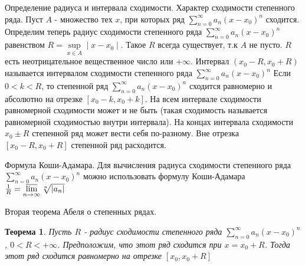 \documentclass[12pt, a4paper]{article}
\newtheorem{thm}{Теорема}
\newenvironment{field}{}{\newpage}
\newif\ifnote
\newenvironment{note}{\notetrue}{\notefalse}
\begin{document}
\begin{note}
\begin{field}
Определение радиуса и интервала сходимости. Характер сходимости степенного ряда.
\end{field}
\begin{field}
Пуст $A$ - множество тех $x$, при которых ряд $\sum\limits_{n=0}^{\infty}a_n(x-x_0)^n$ сходится.
\newline
Определим теперь радиус сходимости степенного ряда $\sum\limits_{n=0}^{\infty}a_n(x-x_0)^n$ равенством $R = \sup\limits_{x \in A}\mid x - x_0 \mid$. Такое $R$ всегда существует, т.к $A$ не пусто. $R$ есть неотрицательное вещественное число или $+\infty$.
\newline
Интервал $(x_0 - R, x_0 + R)$ называется интервалом сходимости степенного ряда $\sum\limits_{n=0}^{\infty}a_n(x-x_0)^n$
\newline
Если $0 < k < R$, то степенной ряд $\sum\limits_{n=0}^{\infty}a_n(x-x_0)^n$ сходится равномерно и абсолютно на отрезке $[x_0 - k, x_0 + k]$. На всем интервале сходимости равномерной сходимости может и не быть (такая сходимость называется равномерной сходимостью внутри интервала). На концах интервала сходимости $x_0 \pm R$ степенной ряд может вести себя по-разному. Вне отрезка $[x_0 - R, x_0 + R]$ степенной ряд расходится.

\end{field}
\end{note}

\begin{note}
\begin{field}
Формула Коши-Адамара.
\end{field}
\begin{field}
Для вычисления радиуса сходимости степенного ряда $\sum\limits_{n=0}^{\infty}a_n(x-x_0)^n$ можно использовать формулу Коши-Адамара $\frac{1}{R} = \varlimsup\limits_{n \to \infty}\sqrt[n]{|a_n|}$


\end{field}
\end{note}

\begin{note}
\begin{field}
Вторая теорема Абеля о степенных рядах.
\end{field}
\begin{field}
\begin{thm}
	Пусть $R$ - радиус сходимости степенного ряда $\sum\limits_{n=0}^{\infty}a_n(x-x_0)^n$,  $0 < R < +\infty$. Предположим, что этот ряд сходится при $x = x_0 + R$. Тогда этот ряд сходится равномерно на отрезке $[x_0, x_0 + R]$
\end{thm}

\end{field}
\end{note}
\end{document}
